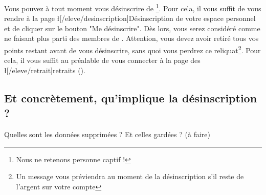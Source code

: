 ﻿Vous pouvez à tout moment vous désinscrire de \eDevoir\footnote{Nous ne retenons personne captif !}. Pour cela, il vous suffit de vous rendre à la page \l[/eleve/desinscription]{Désinscription} de votre espace personnel et de cliquer sur le bouton "Me désinscrire". Dès lors, vous serez considéré comme ne faisant plus parti des membres de \eDevoir. Attention, vous devez avoir retiré tous vos points restant avant de vous désinscrire, sans quoi vous perdrez ce reliquat\footnote{Un message vous préviendra au moment de la désinscription s'il reste de l'argent sur votre compte \eDevoir}. Pour cela, il vous suffit au préalable de vous connecter à la page des \l[/eleve/retrait]{retraits} ().

\subsection{Et concrètement, qu'implique la désinscription ?}
Quelles sont les données supprimées ? Et celles gardées ? (à faire)